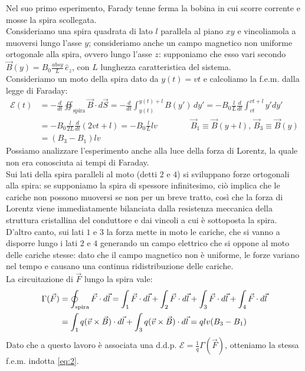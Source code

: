 \documentclass[]{article}
\newcommand{\E}{\mathcal{E}}
\begin{document}
Nel suo primo esperimento, Farady tenne ferma la bobina in cui scorre corrente e mosse la spira scollegata. \\ 
%
Consideriamo una spira quadrata di lato $ l $ parallela al piano $ xy $ e vincoliamola a muoversi lungo l'asse $ y $; consideriamo anche un campo magnetico non uniforme ortogonale alla spira, ovvero lungo l'asse $ z $: supponiamo che esso vari secondo $ \vec{B}(y) = B_0 \frac{abs{y}}{L} \,\hat{e}_z $, con $ L $ lunghezza caratteristica del sistema. \\ 
%
Consideriamo un moto della spira dato da $ y(t) = vt $ e calcoliamo la f.e.m. dalla legge di Faraday:
\begin{equation}
	\begin{split}
		\E(t) &= -\frac{d}{dt} \oiint_{\text{spira}} \vec{B}\cdot d\vec{S} = -\frac{d}{dt} \int_{y(t)}^{y(t)+l} B(y')\,dy' = -B_0 \frac{l}{L} \frac{d}{dt} \int_{vt}^{vt+l} y'dy' \\ 
		      &= -B_0 \frac{l}{2L} \frac{d}{dt} (2vt + l) = - B_0 \frac{l}{L} lv \qquad\qquad \vec{B}_1 \equiv \vec{B}(y + l), \, \vec{B}_3 \equiv \vec{B}(y) \\ 
		      &= (B_3 - B_1) lv
	\end{split}
	\label{eq:2}
\end{equation}
Possiamo analizzare l'esperimento anche alla luce della forza di Lorentz, la quale non era conosciuta ai tempi di Faraday. \\ 
%
Sui lati della spira paralleli al moto (detti $ 2 $ e $ 4 $) si sviluppano forze ortogonali alla spira: se supponiamo la spira di spessore infinitesimo, ciò implica che le cariche non possono muoversi se non per un breve tratto, così che la forza di Lorentz viene immediatamente bilanciata dalla resistenza meccanica della struttura cristallina del conduttore e dai vincoli a cui è sottoposta la spira. D'altro canto, sui lati $ 1 $ e $ 3 $ la forza mette in moto le cariche, che si vanno a disporre lungo i lati $ 2 $ e $ 4 $ generando un campo elettrico che si oppone al moto delle cariche stesse: dato che il campo magnetico non è uniforme, le forze variano nel tempo e causano una continua ridistribuzione delle cariche. \\ 
%
La circuitazione di $ \vec{F} $ lungo la spira vale:
\begin{equation}
	\begin{split}
		\Gamma(\vec{F}) &= \oint_{\text{spira}} \vec{F}\cdot d\vec{l} = \int_1 \vec{F}\cdot d\vec{l} + \int_2 \vec{F}\cdot d\vec{l} + \int_3 \vec{F}\cdot d\vec{l} + \int_4 \vec{F}\cdot d\vec{l} \\ 
				&= \int_1 q (\vec{v}\times\vec{B})\cdot d\vec{l} + \int_3 q (\vec{v}\times\vec{B})\cdot d\vec{l} = qlv(B_3 - B_1)
	\end{split}
	\label{eq:3}
\end{equation}
Dato che a questo lavoro è associata una d.d.p. $ \E = \frac{1}{q} \Gamma(\vec{F}) $, otteniamo la stessa f.e.m. indotta \ref{eq:2}.
\end{document}
